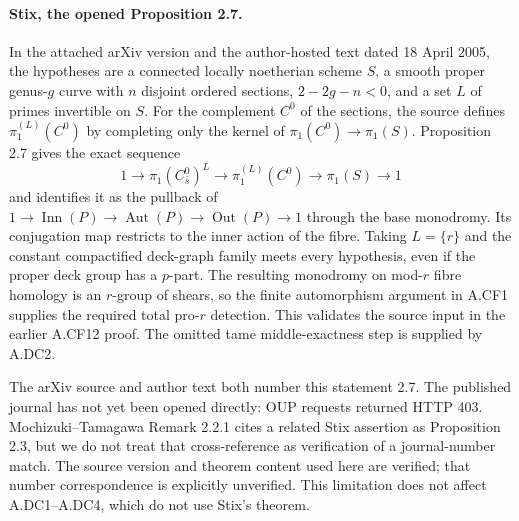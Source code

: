 \paragraph{Stix, the opened Proposition 2.7.}
In the attached arXiv version and the author-hosted text dated
18 April 2005, the hypotheses are a connected locally noetherian
scheme $S$, a smooth proper genus-$g$ curve with $n$ disjoint ordered
sections, $2-2g-n<0$, and a set $L$ of primes invertible on $S$.
For the complement $C^0$ of the sections, the source defines
$\pi_1^{(L)}(C^0)$ by completing only the kernel of
$\pi_1(C^0)\to\pi_1(S)$. Proposition 2.7 gives the exact sequence
\[
 1\to\pi_1(C^0_{\bar s})^L\to\pi_1^{(L)}(C^0)
 \to\pi_1(S)\to1
\]
and identifies it as the pullback of
$1\to\operatorname{Inn}(P)\to\operatorname{Aut}(P)
\to\operatorname{Out}(P)\to1$ through the base monodromy.
Its conjugation map restricts to the inner action of the fibre.
Taking $L=\{r\}$ and the constant compactified deck-graph family
meets every hypothesis, even if the proper deck group has a $p$-part.
The resulting monodromy on mod-$r$ fibre homology is an $r$-group of
shears, so the finite automorphism argument in A.CF1 supplies the
required total pro-$r$ detection. This validates the source input in
the earlier A.CF12 proof. The omitted tame middle-exactness step is
supplied by A.DC2.

The arXiv source and author text both number this statement 2.7.
The published journal has not yet been opened directly: OUP requests
returned HTTP 403. Mochizuki--Tamagawa Remark 2.2.1 cites a related
Stix assertion as Proposition 2.3, but we do not treat that
cross-reference as verification of a journal-number match.
The source version and theorem content used here are verified; that
number correspondence is explicitly unverified. This limitation does
not affect A.DC1--A.DC4, which do not use Stix's theorem.

